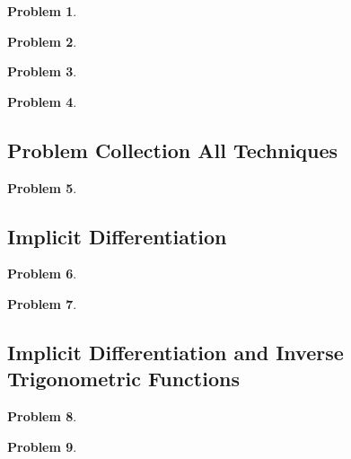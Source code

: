 \documentclass{article}
\newtheorem{problem}{Problem}
\begin{document}
\begin{problem}

\end{problem}

\begin{problem}

\end{problem}


\begin{problem}

\end{problem}
\begin{problem}

\end{problem}
\subsection{Problem Collection All Techniques}
\begin{problem}

\end{problem}


\subsection{Implicit Differentiation}\label{secMPSImplicitDifferentiation}
\begin{problem}

\end{problem}
\begin{problem}

\end{problem}


\subsection{Implicit Differentiation and Inverse Trigonometric Functions}
\begin{problem}

\end{problem}
\begin{problem}

\end{problem}
\end{document}

